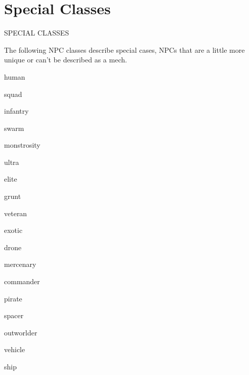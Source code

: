 \chapter{Special Classes}
      SPECIAL CLASSES

The following NPC classes describe special cases, NPCs that are a little more unique or can’t be
described as a mech.

{human}

{squad}

{infantry}

{swarm}

{monstrosity}

{ultra}

{elite}

{grunt}

{veteran}

{exotic}

{drone}

{mercenary}

{commander}

{pirate}

{spacer}

{outworlder}

{vehicle}

{ship}


